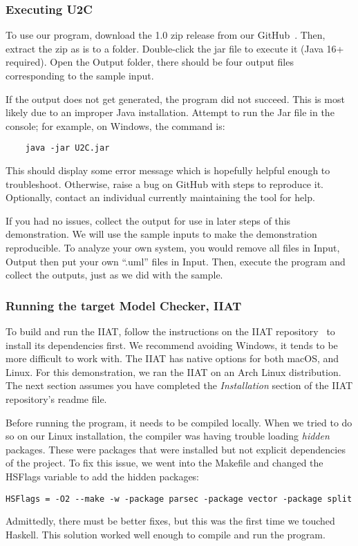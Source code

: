 \newpage
\subsubsection{Executing U2C}\label{subsubsec:exec}
To use our program, download the 1.0 zip release from our GitHub~\cite{repo_u2c}.
Then, extract the zip as is to a folder.
Double-click the jar file to execute it (Java 16+ required).
Open the Output folder, there should be four output files corresponding to the sample input.

If the output does not get generated, the program did not succeed.
This is most likely due to an improper Java installation.
Attempt to run the Jar file in the console; for example, on Windows, the command is:
\begin{verbatim}
    java -jar U2C.jar
\end{verbatim}
This should display some error message which is hopefully helpful enough to troubleshoot.
Otherwise, raise a bug on GitHub with steps to reproduce it.
Optionally, contact an individual currently maintaining the tool for help.

If you had no issues, collect the output for use in later steps of this demonstration.
We will use the sample inputs to make the demonstration reproducible.
To analyze your own system, you would remove all files in Input, Output then put your own ``.uml'' files in Input.
Then, execute the program and collect the outputs, just as we did with the sample.

\subsubsection{Running the target Model Checker, IIAT}\label{subsubsec:iiat-run}
To build and run the IIAT, follow the instructions on the IIAT repository~\cite{repo_iiat} to install its dependencies first.
We recommend avoiding Windows, it tends to be more difficult to work with.
The IIAT has native options for both macOS, and Linux.
For this demonstration, we ran the IIAT on an Arch Linux distribution.
The next section assumes you have completed the \textit{Installation} section of the IIAT repository's readme file.

Before running the program, it needs to be compiled locally.
When we tried to do so on our Linux installation, the compiler was having trouble loading \textit{hidden} packages.
These were packages that were installed but not explicit dependencies of the project.
To fix this issue, we went into the Makefile and changed the HSFlags variable to add the hidden packages:
\begin{verbatim}HSFlags = -O2 --make -w -package parsec -package vector -package split\end{verbatim}
Admittedly, there must be better fixes, but this was the first time we touched Haskell.
This solution worked well enough to compile and run the program.

